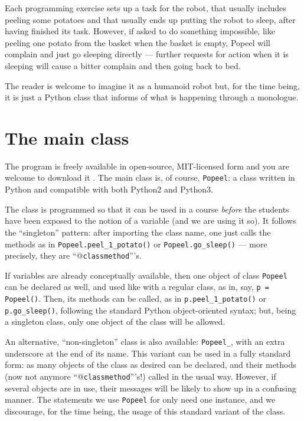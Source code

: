 \documentclass[12pt]{article}
\begin{document}
Each programming exercise sets up a task for the
robot, that usually includes peeling some potatoes
and that usually ends up putting the robot to sleep,
after having finished its task. However, if asked to
do something impossible, like peeling one potato
from the basket
when the basket is empty, Popeel will complain and
just go sleeping directly --- further requests for action
when it is sleeping will cause a bitter complain
and then going back to bed.

The reader is welcome to imagine it as a humanoid 
robot but, for the time being, it is just a Python 
class that informs of what is happening through
a monologue.


\section{The main class}

The program is freely available in open-source,
MIT-licensed form \cite{MITlicense} and you are welcome
to download it \cite{Popeel}.
The main class is, of course, {\tt Popeel}: a class
written in Python and compatible with both
Python2 and Python3.

The class is programmed so that it can be used in a course
{\it before} the students have been exposed to the 
notion of a variable (and we are using it so).
It follows the ``singleton'' pattern: after 
importing the class name, one just calls the methods as in 
{\tt Popeel.peel_1_potato()} or {\tt Popeel.go_sleep()}
 --- more precisely, they are ``@{\tt classmethod}'''s.

If variables are already conceptually available, then
one object of class {\tt Popeel} 
can be declared as well, and used like with a regular class,
as in, say, {\tt p = Popeel()}. Then, its methods
can be called, as in {\tt p.peel_1_potato()} or
{\tt p.go_sleep()}, following the standard
Python object-oriented syntax; but, being a
singleton class, only one object of the class
will be allowed. 

An alternative, ``non-singleton'' class is also 
available: {\tt Popeel_}, with an extra underscore
at the end of its name. This variant can be used in a
fully standard form: as many objects of the class 
as desired can be declared, and their 
methods (now not anymore ``@{\tt classmethod}'''s!) %
called in the usual way. However, if several
objects are in use, their messages will be likely
to show up in a confusing manner. The statements
we use {\tt Popeel} for only need one instance, and
we discourage, for the time being, the usage of this 
standard variant of the class.
\end{document}

